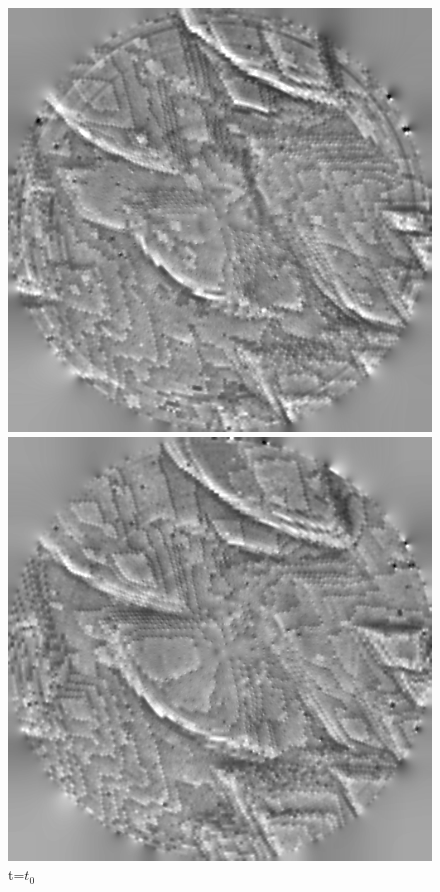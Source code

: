 \begin{figure}[!ht]
\centering
{}
  	\includegraphics[width=\linewidth]{images/006_X10s50l10m_MOv2_17.png}
    \caption*{t=$t_0$} 
\endminipage\hfill
{}
  	\includegraphics[width=\linewidth]{images/006_X10s50l10m_MOv2_122.png}

\end{figure}
